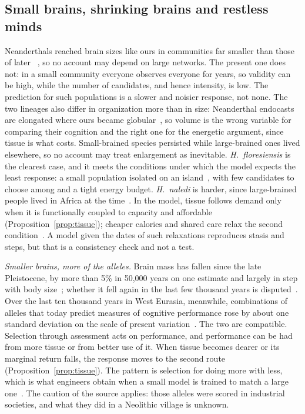 \subsection{Small brains, shrinking brains and restless minds}\label{sec:reshominins}

Neanderthals reached brain sizes like ours in communities far smaller than those of later
\Hs~\cite{prufer2014,skov2022}, so no account may depend on large networks. The present one does not: in a small community
everyone observes everyone for years, so validity can be high, while the number of candidates, and hence intensity, is
low. The prediction for such populations is a slower and noisier response, not none. The two lineages also differ in
organization more than in size: Neanderthal endocasts are elongated where ours became globular~\cite{neubauer2018}, so
volume is the wrong variable for comparing their cognition and the right one for the energetic argument, since tissue is
what costs. Small-brained species persisted while large-brained ones lived elsewhere, so no account may treat enlargement
as inevitable. \textit{H.~floresiensis} is the clearest case, and it meets the conditions under which the model expects
the least response: a small population isolated on an island~\cite{sutikna2016,brumm2016}, with few candidates to choose
among and a tight energy budget. \textit{H.~naledi} is harder, since large-brained people lived in Africa at the
time~\cite{dirks2017}. In the model, tissue follows demand only when it is functionally coupled to capacity and affordable
(Proposition~\ref{prop:tissue}); cheaper calories and shared care relax the second
condition~\cite{carmody2011,hawkes1998,burkart2014}. A model given the dates of such relaxations reproduces stasis and steps, but
that is a consistency check and not a test.

\emph{Smaller brains, more of the alleles.} Brain mass has fallen since the late Pleistocene, by more than 5\% in 50,000
years on one estimate and largely in step with body size~\cite{stibel2021,ruff1997}; whether it fell again in the last few
thousand years is disputed~\cite{desilva2021,villmoare2022}. Over the last ten thousand years in West Eurasia, meanwhile,
combinations of alleles that today predict measures of cognitive performance rose by about one standard deviation on the
scale of present variation~\cite{akbari2026}. The two are compatible. Selection through assessment acts on performance,
and performance can be had from more tissue or from better use of it. When tissue becomes dearer or its marginal return
falls, the response moves to the second route (Proposition~\ref{prop:tissue}). The pattern is selection for doing more
with less, which is what engineers obtain when a small model is trained to match a large one~\cite{hinton2015}. The
caution of the source applies: those alleles were scored in industrial societies, and what they did in a Neolithic
village is unknown.

